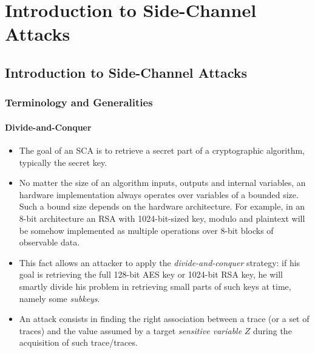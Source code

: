 \chapter{Introduction to Side-Channel Attacks} %

\label{ChapterIntroductionSCA}


\section{Introduction to Side-Channel Attacks}

\subsection{Terminology and Generalities}

\subsubsection{Divide-and-Conquer}

\begin{itemize}
\item The goal of an SCA is to retrieve a secret part of a cryptographic algorithm, typically the secret key.
\item No matter the size of an algorithm inputs, outputs and internal variables, an hardware implementation  always operates over variables of a bounded size. Such a bound size depends on the hardware architecture. For example, in an 8-bit architecture an RSA with 1024-bit-sized key, modulo and plaintext will be somehow implemented as multiple operations over 8-bit blocks of observable data. 
\item This fact allows an attacker to apply the \emph{divide-and-conquer} strategy: if his goal is retrieving the full 128-bit AES key or 1024-bit RSA key, he will smartly divide his problem in retrieving small parts of such keys at time, namely some \emph{subkeys}.  
\item An attack consists in finding the right association between a trace (or a set of traces) and the value assumed by a target \emph{sensitive variable} $Z$ during the acquisition of such trace/traces. 
\end{itemize}
